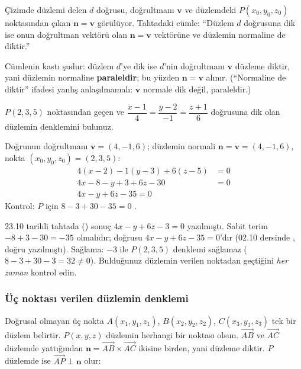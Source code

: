 \begin{tahta}
Çizimde düzlemi delen $d$ doğrusu, doğrultmanı $\mathbf v$ ve düzlemdeki $P(x_0,y_0,z_0)$ noktasından çıkan $\mathbf n=\mathbf v$ görülüyor. Tahtadaki cümle: ``Düzlem $d$ doğrusuna dik ise onun doğrultman vektörü olan $\mathbf n=\mathbf v$ vektörüne ve düzlemin normaline de diktir.''
\end{tahta}
\begin{bilgi}
Cümlenin kastı şudur: düzlem $d$'ye dik ise $d$'nin doğrultmanı $\mathbf v$ düzleme diktir, yani düzlemin normaline \textbf{paraleldir}; bu yüzden $\mathbf n=\mathbf v$ alınır. (``Normaline de diktir'' ifadesi yanlış anlaşılmamalı: $\mathbf v$ normale dik değil, paraleldir.)
\end{bilgi}

\begin{soru}
$P(2,3,5)$ noktasından geçen ve $\dfrac{x-1}{4}=\dfrac{y-2}{-1}=\dfrac{z+1}{6}$ doğrusuna dik olan düzlemin denklemini bulunuz.
\end{soru}
\begin{cevap}
Doğrunun doğrultmanı $\mathbf v=(4,-1,6)$; düzlemin normali $\mathbf n=\mathbf v=(4,-1,6)$, nokta $(x_0,y_0,z_0)=(2,3,5)$:
\begin{align*}
4(x-2)-1(y-3)+6(z-5)&=0\\
4x-8-y+3+6z-30&=0\\
\boxed{4x-y+6z-35=0}&
\end{align*}
Kontrol: $P$ için $8-3+30-35=0$ \checkmark.
\end{cevap}
\begin{dikkat}
23.10 tarihli tahtada () sonuç $4x-y+6z-3=0$ yazılmıştı. Sabit terim $-8+3-30=-35$ olmalıdır; doğrusu $4x-y+6z-35=0$'dır (02.10 dersinde ,  doğru yazılmıştı). Sağlama: $-3$ ile $P(2,3,5)$ denklemi sağlamaz ($8-3+30-3=32\neq0$). Bulduğunuz düzlemin verilen noktadan geçtiğini \emph{her zaman} kontrol edin.
\end{dikkat}

\subsubsection{Üç noktası verilen düzlemin denklemi}

Doğrusal olmayan üç nokta $A(x_1,y_1,z_1)$, $B(x_2,y_2,z_2)$, $C(x_3,y_3,z_3)$ tek bir düzlem belirtir. $P(x,y,z)$ düzlemin herhangi bir noktası olsun. $\overrightarrow{AB}$ ve $\overrightarrow{AC}$ düzlemde yattığından $\mathbf n=\overrightarrow{AB}\times\overrightarrow{AC}$ ikisine birden, yani düzleme diktir. $P$ düzlemde ise $\overrightarrow{AP}\perp\mathbf n$ olur:

